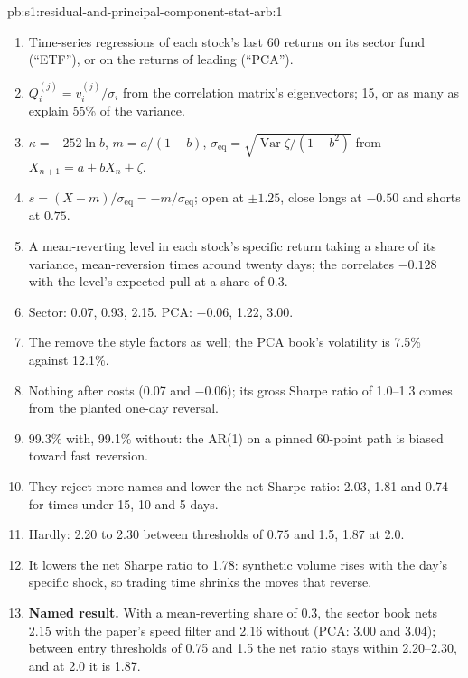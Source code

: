 \begin{solution}{pb:s1:residual-and-principal-component-stat-arb:1}
\begin{enumerate}
\item Time-series regressions of each stock's last 60 returns on its sector fund (``ETF''), or on the returns of leading  (``PCA'').
\item $Q^{(j)}_i = v^{(j)}_i/\sigma_i$ from the correlation matrix's eigenvectors; 15, or as many as explain 55\% of the variance.
\item $\kappa = -252 \ln b$, $m = a/(1-b)$, $\sigma_{\mathrm{eq}} = \sqrt{\operatorname{Var}\zeta/(1-b^2)}$ from $X_{n+1} = a + bX_n + \zeta$.
\item $s = (X - m)/\sigma_{\mathrm{eq}} = -m/\sigma_{\mathrm{eq}}$; open at $\pm 1.25$, close longs at $-0.50$ and shorts at $0.75$.
\item A mean-reverting level in each stock's specific return taking a share of its variance, mean-reversion times around twenty days; the  correlates
$-0.128$ with the level's expected pull at a share of 0.3.
\item Sector: 0.07, 0.93, 2.15. PCA: $-0.06$, 1.22, 3.00.
\item The  remove the style factors as well; the PCA book's volatility is 7.5\% against 12.1\%.
\item Nothing after costs (0.07 and $-0.06$); its gross Sharpe ratio of 1.0--1.3 comes from the planted one-day reversal.
\item 99.3\% with, 99.1\% without: the AR(1) on a pinned 60-point path is biased toward fast reversion.
\item They reject more names and lower the net Sharpe ratio: 2.03, 1.81 and 0.74 for times under 15, 10 and 5 days.
\item Hardly: 2.20 to 2.30 between thresholds of 0.75 and 1.5, 1.87 at 2.0.
\item It lowers the net Sharpe ratio to 1.78: synthetic volume rises with the day's specific shock, so trading time shrinks the moves that reverse.
\item \textbf{Named result.} With a mean-reverting share of 0.3, the sector book nets 2.15 with the paper's speed filter and 2.16 without (PCA: 3.00 and
3.04); between entry thresholds of 0.75 and 1.5 the net ratio stays within 2.20--2.30, and at 2.0 it is 1.87.

\end{enumerate}
\end{solution}
